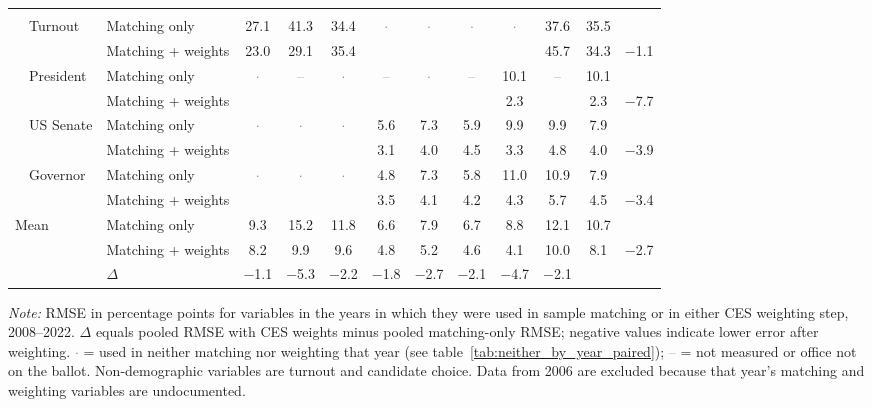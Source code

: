 \begin{table}[!htbp]
{\begin{threeparttable}
\begin{tabular}{llcccccccccc}
\addlinespace[0.3em]
\multicolumn{12}{l}{Non-demographic} \\
\addlinespace[0.1em]
~~Turnout & Matching only & 27.1 & 41.3 & 34.4 & \textcolor{gray}{$\cdot$} & \textcolor{gray}{$\cdot$} & \textcolor{gray}{$\cdot$} & \textcolor{gray}{$\cdot$} & 37.6 & 35.5 & \\
 & Matching + weights & 23.0 & 29.1 & 35.4 &  &  &  &  & 45.7 & 34.3 & $-$1.1 \\
\addlinespace[0.1em]
~~President & Matching only & \textcolor{gray}{$\cdot$} & \textcolor{gray}{--} & \textcolor{gray}{$\cdot$} & \textcolor{gray}{--} & \textcolor{gray}{$\cdot$} & \textcolor{gray}{--} & 10.1 & \textcolor{gray}{--} & 10.1 & \\
 & Matching + weights &  &  &  &  &  &  & 2.3 &  & 2.3 & $-$7.7 \\
\addlinespace[0.1em]
~~US Senate & Matching only & \textcolor{gray}{$\cdot$} & \textcolor{gray}{$\cdot$} & \textcolor{gray}{$\cdot$} & 5.6 & 7.3 & 5.9 & 9.9 & 9.9 & 7.9 & \\
 & Matching + weights &  &  &  & 3.1 & 4.0 & 4.5 & 3.3 & 4.8 & 4.0 & $-$3.9 \\
\addlinespace[0.1em]
~~Governor & Matching only & \textcolor{gray}{$\cdot$} & \textcolor{gray}{$\cdot$} & \textcolor{gray}{$\cdot$} & 4.8 & 7.3 & 5.8 & 11.0 & 10.9 & 7.9 & \\
 & Matching + weights &  &  &  & 3.5 & 4.1 & 4.2 & 4.3 & 5.7 & 4.5 & $-$3.4 \\
\midrule
Mean\tnote{b} & Matching only & 9.3 & 15.2 & 11.8 & 6.6 & 7.9 & 6.7 & 8.8 & 12.1 & 10.7 & \\
 & Matching + weights & 8.2 & 9.9 & 9.6 & 4.8 & 5.2 & 4.6 & 4.1 & 10.0 & 8.1 & $-$2.7 \\
 & $\Delta$ & $-$1.1 & $-$5.3 & $-$2.2 & $-$1.8 & $-$2.7 & $-$2.1 & $-$4.7 & $-$2.1 & & \\
\bottomrule
\end{tabular}
\begin{tablenotes}
\footnotesize
\item \textit{Note:} RMSE in percentage points for variables in the years in which they were used in sample matching or in either CES weighting step, 2008--2022. $\Delta$ equals pooled RMSE with CES weights minus pooled matching-only RMSE; negative values indicate lower error after weighting. \textcolor{gray}{$\cdot$} = used in neither matching nor weighting that year (see table~\ref{tab:neither_by_year_paired}); \textcolor{gray}{--} = not measured or office not on the ballot. Non-demographic variables are turnout and candidate choice. Data from 2006 are excluded because that year's matching and weighting variables are undocumented.

\end{tablenotes}
\end{threeparttable}}
\end{table}
